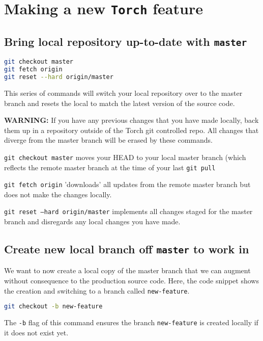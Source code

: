 \documentclass[10pt]{article}
\begin{document}
\section{Making a new \texttt{Torch} feature}

\subsection{Bring local repository up-to-date with \texttt{master}}
\begin{lstlisting}[language=bash]
git checkout master
git fetch origin
git reset --hard origin/master
\end{lstlisting}

This series of commands will switch your local repository over to the master branch and resets the local to match the latest version of the source code.

\textbf{WARNING:} If you have any previous changes that you have made locally, back them up in a repository outside of the Torch git controlled repo. All changes that diverge from the master branch will be erased by these commands.

\texttt{git checkout master} moves your HEAD to your local master branch (which reflects the remote master branch at the time of your last \texttt{git pull}

\texttt{git fetch origin} 'downloads' all updates from the remote master branch but does not make the changes locally.

\texttt{git reset --hard origin/master} implements all changes staged for the master branch and disregards any local changes you have made.

\subsection{Create new local branch off \texttt{master} to work in}

We want to now create a local copy of the master branch that we can augment without consequence to the production source code. Here, the code snippet shows the creation and switching to a branch called \texttt{new-feature}.

\begin{lstlisting}[language=bash]
git checkout -b new-feature
\end{lstlisting}

The \texttt{-b} flag of this command ensures the branch \texttt{new-feature} is created locally if it does not exist yet.
\end{document}
